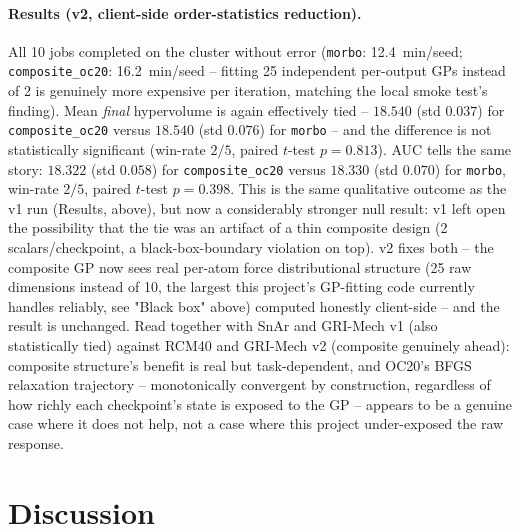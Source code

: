 \documentclass[11pt]{article}
\begin{document}
\paragraph{Results (v2, client-side order-statistics reduction).} All
10 jobs completed on the cluster without error (\texttt{morbo}:
12.4~min/seed; \texttt{composite\_oc20}: 16.2~min/seed -- fitting 25
independent per-output GPs instead of 2 is genuinely more expensive
per iteration, matching the local smoke test's finding). Mean
\emph{final} hypervolume is again effectively tied -- $18.540$ (std
$0.037$) for \texttt{composite\_oc20} versus $18.540$ (std $0.076$) for
\texttt{morbo} -- and the difference is not statistically significant
(win-rate $2/5$, paired $t$-test $p=0.813$). AUC tells the same story:
$18.322$ (std $0.058$) for \texttt{composite\_oc20} versus $18.330$
(std $0.070$) for \texttt{morbo}, win-rate $2/5$, paired $t$-test
$p=0.398$. This is the same qualitative outcome as the v1 run
(Results, above), but now a considerably stronger null result: v1 left
open the possibility that the tie was an artifact of a thin composite
design (2 scalars/checkpoint, a black-box-boundary violation on top).
v2 fixes both -- the composite GP now sees real per-atom force
distributional structure (25 raw dimensions instead of 10, the largest
this project's GP-fitting code currently handles reliably, see "Black
box" above) computed honestly client-side -- and the result is
unchanged. Read together with SnAr and GRI-Mech v1 (also statistically
tied) against RCM40 and GRI-Mech v2 (composite genuinely ahead):
composite structure's benefit is real but task-dependent, and OC20's
BFGS relaxation trajectory -- monotonically convergent by construction,
regardless of how richly each checkpoint's state is exposed to the
GP -- appears to be a genuine case where it does not help, not a case
where this project under-exposed the raw response.

\section{Discussion}
\end{document}
